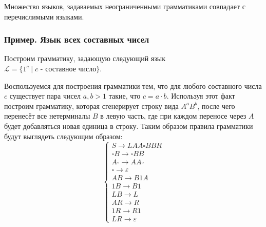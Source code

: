 \documentclass[
    11pt,
    a4paper
]{article}
\theoremstyle{definition}
\begin{document}
Множество языков, задаваемых неограниченными грамматиками совпадает с перечислимыми языками.

\subsubsection{Пример. Язык всех составных чисел}

Построим грамматику, задающую следующий язык $\mathcal{L} = \{1^{c} \mid c \text{ - составное число}\}$.

Воспользуемся для построения грамматики тем, что для любого составного числа $c$ существует пара чисел $a, b > 1$ такие, что $c = a \cdot b$. Используя этот факт построим грамматику, которая сгенерирует строку вида $A^aB^b$, после чего перенесёт все нетерминалы $B$ в левую часть, где при каждом переносе через $A$ будет добавляться новая единица в строку. Таким образом правила грамматики будут выглядеть следующим образом:
$$\begin{cases}
S \rightarrow L A A \square BB R\\
\square B \rightarrow \square BB\\
A \square \rightarrow A A \square\\
\square \rightarrow \varepsilon\\
AB \rightarrow B1A\\
1B \rightarrow B1\\
LB \rightarrow L\\
AR \rightarrow R\\
1R \rightarrow R1\\
LR \rightarrow \varepsilon
\end{cases}$$
\end{document}
